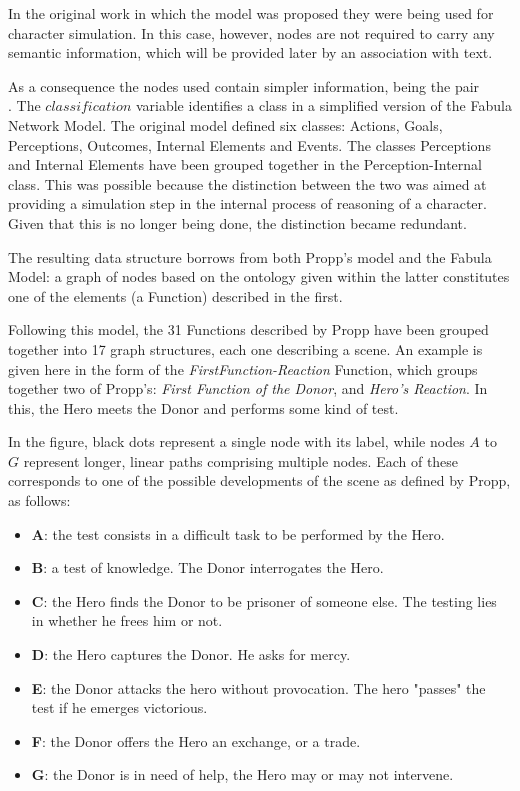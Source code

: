 \documentclass[12pt,a4paper,oneside]{report}
\begin{document}
In the original work in which the model was proposed they were being used for character simulation. In this case, however, nodes are not required to carry any semantic information, which will be provided later by an association with text.

As a consequence the nodes used contain simpler information, being the pair\\ \(<label,classification>\). The \(classification\) variable identifies a class in a simplified version of the Fabula Network Model. The original model defined six classes: Actions, Goals, Perceptions, Outcomes, Internal Elements and Events. The classes Perceptions and Internal Elements have been grouped together in the Perception-Internal class. This was possible because the distinction between the two was aimed at providing a simulation step in the internal process of reasoning of a character. Given that this is no longer being done, the distinction became redundant.

The resulting data structure borrows from both Propp's model and the Fabula Model: a graph of nodes based on the ontology given within the latter constitutes one of the elements (a Function) described in the first.

\bigskip

Following this model, the 31 Functions described by Propp have been grouped together into 17 graph structures, each one describing a scene. An example is given here in the form of the \textit{FirstFunction-Reaction} Function, which groups together two of Propp's: \textit{First Function of the Donor}, and \textit{Hero's Reaction}. In this, the Hero meets the Donor and performs some kind of test.

\bigskip

In the figure, black dots represent a single node with its label, while nodes \(A\) to \(G\) represent longer, linear paths comprising multiple nodes. Each of these corresponds to one of the possible developments of the scene as defined by Propp, as follows:

\begin{itemize}\setlength{\itemsep}{0pt}
\item \textbf{A}: the test consists in a difficult task to be performed by the Hero.
\item \textbf{B}: a test of knowledge. The Donor interrogates the Hero.
\item \textbf{C}: the Hero finds the Donor to be prisoner of someone else. The testing lies in whether he frees him or not. 
\item \textbf{D}: the Hero captures the Donor. He asks for mercy.
\item \textbf{E}: the Donor attacks the hero without provocation. The hero "passes" the test if he emerges victorious.
\item \textbf{F}: the Donor offers the Hero an exchange, or a trade.
\item \textbf{G}: the Donor is in need of help, the Hero may or may not intervene.
\end{itemize}
\end{document}
